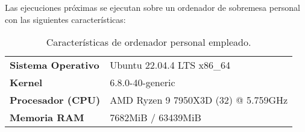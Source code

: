 Las ejecuciones próximas se ejecutan sobre un ordenador de sobremesa
personal con las siguientes características:

\begin{table}[h!]
    \centering
    \begin{tabular}{ll}
        \toprule
        \textbf{Sistema Operativo}   & Ubuntu 22.04.4 LTS x86\_64 \\ 
        \textbf{Kernel}              & 6.8.0-40-generic \\ 
        \textbf{Procesador (CPU)}    & AMD Ryzen 9 7950X3D (32) @ 5.759GHz \\ 
        \textbf{Memoria RAM}         & 7682MiB / 63439MiB \\ 
        \bottomrule
    \end{tabular}
    \caption{Características de ordenador personal empleado.}
    \label{tab:specs}
\end{table}
